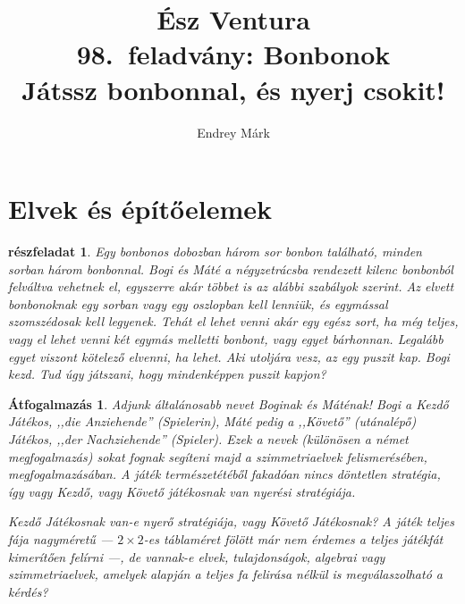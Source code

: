 \documentclass{article}
\author{Endrey Márk}
\title{Ész Ventura\\98.~feladvány: Bonbonok\\\large Játssz bonbonnal, és nyerj csokit!}
\newtheorem{subproblem}{részfeladat}
\newtheorem*{reword}{Átfogalmazás}
\begin{document}
	\maketitle
	\tableofcontents
	\section{Elvek és építőelemek}
		\begin{subproblem}
			Egy bonbonos dobozban három sor bonbon található, minden sorban három bonbonnal. Bogi és Máté a négyzetrácsba rendezett kilenc bonbonból felváltva vehetnek el, egyszerre akár többet is az alábbi szabályok szerint. Az elvett bonbonoknak egy sorban vagy egy oszlopban kell lenniük, és egymással szomszédosak kell legyenek. Tehát el lehet venni akár egy egész sort, ha még teljes, vagy el lehet venni két egymás melletti bonbont, vagy egyet bárhonnan. Legalább egyet viszont kötelező elvenni, ha lehet. Aki utoljára vesz, az egy puszit kap. Bogi kezd. Tud úgy játszani, hogy mindenképpen puszit kapjon?
		\end{subproblem}

		\begin{reword}
			Adjunk általánosabb nevet Boginak és Máténak! Bogi a Kezdő Játékos, ,,die Anziehende'' (Spielerin), Máté pedig a ,,Követő'' (utánalépő) Játékos, ,,der Nachziehende'' (Spieler).
			Ezek a nevek (különösen a német megfogalmazás) sokat fognak segíteni majd a szimmetriaelvek felismerésében, megfogalmazásában.
			A játék természetétéből fakadóan nincs döntetlen stratégia, így vagy Kezdő, vagy Követő játékosnak van nyerési stratégiája.

			Kezdő Játékosnak van-e nyerő stratégiája, vagy Követő Játékosnak?
			A játék teljes fája nagyméretű --- $2\times2$-es táblaméret fölött már nem érdemes a teljes játékfát kimerítően felírni ---, de vannak-e elvek, tulajdonságok, algebrai vagy szimmetriaelvek, amelyek alapján a teljes fa felirása nélkül is megválaszolható a kérdés?
		\end{reword}
\end{document}
